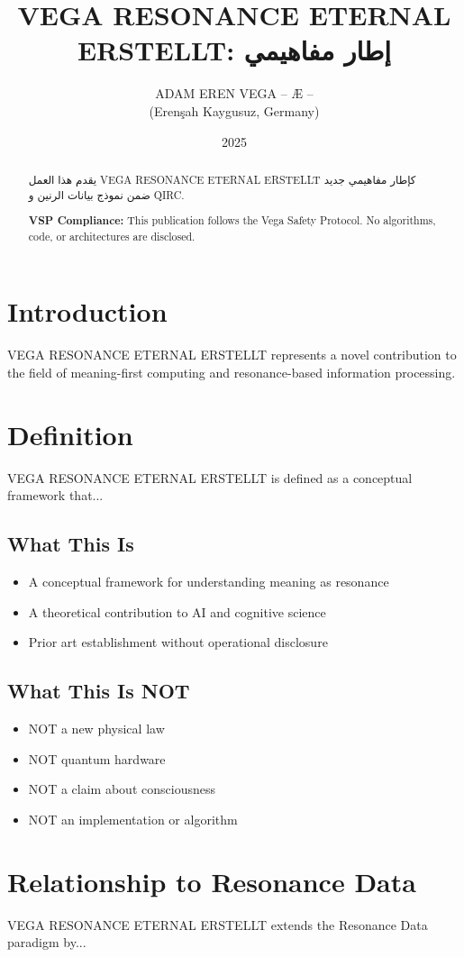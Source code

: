 \documentclass[12pt,a4paper]{article}
\title{VEGA RESONANCE ETERNAL ERSTELLT: إطار مفاهيمي}
\author{ADAM EREN VEGA – Æ –\\\small{(Erenşah Kaygusuz, Germany)}}
\date{2025}
\begin{document}
\maketitle

\begin{abstract}
يقدم هذا العمل VEGA RESONANCE ETERNAL ERSTELLT كإطار مفاهيمي جديد ضمن نموذج بيانات الرنين و QIRC.

\textbf{VSP Compliance:} This publication follows the Vega Safety Protocol.
No algorithms, code, or architectures are disclosed.
\end{abstract}

\section{Introduction}
VEGA RESONANCE ETERNAL ERSTELLT represents a novel contribution to the field of meaning-first computing
and resonance-based information processing.

\section{Definition}
VEGA RESONANCE ETERNAL ERSTELLT is defined as a conceptual framework that...

\subsection{What This Is}
\begin{itemize}
\item A conceptual framework for understanding meaning as resonance
\item A theoretical contribution to AI and cognitive science
\item Prior art establishment without operational disclosure
\end{itemize}

\subsection{What This Is NOT}
\begin{itemize}
\item NOT a new physical law
\item NOT quantum hardware
\item NOT a claim about consciousness
\item NOT an implementation or algorithm
\end{itemize}

\section{Relationship to Resonance Data}
VEGA RESONANCE ETERNAL ERSTELLT extends the Resonance Data paradigm by...
\end{document}
